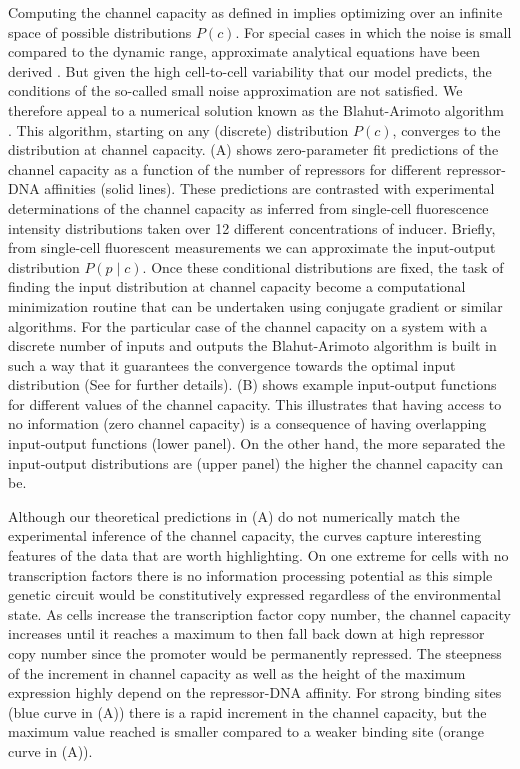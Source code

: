 Computing the channel capacity as defined in  implies
optimizing over an infinite space of possible distributions $P(c)$. For special
cases in which the noise is small compared to the dynamic range, approximate
analytical equations have been derived \cite{Tkacik2008a}. But given the high
cell-to-cell variability that our model predicts, the conditions of the
so-called small noise approximation are not satisfied. We therefore appeal to a
numerical solution known as the Blahut-Arimoto algorithm \cite{Blahut1972}.
This algorithm, starting on any (discrete) distribution $P(c)$, converges to
the distribution at channel capacity. (A) shows
zero-parameter fit predictions of the channel capacity as a function of the
number of repressors for different repressor-DNA affinities (solid lines).
These predictions are contrasted with experimental determinations of the
channel capacity as inferred from single-cell fluorescence intensity
distributions taken over 12 different concentrations of inducer. Briefly, from
single-cell fluorescent measurements we can approximate the input-output
distribution $P(p \mid c)$. Once these conditional distributions are fixed, the
task of finding the input distribution at channel capacity become a
computational minimization routine that can be undertaken using conjugate
gradient or similar algorithms. For the particular case of the channel capacity
on a system with a discrete number of inputs and outputs the Blahut-Arimoto
algorithm is built in such a way that it guarantees the convergence towards the
optimal input distribution (See  for further details).
(B) shows example input-output functions for different
values of the channel capacity. This illustrates that having access to no
information (zero channel capacity) is a consequence of having overlapping
input-output functions (lower panel). On the other hand, the more separated the
input-output distributions are (upper panel) the higher the channel capacity
can be.

Although our theoretical predictions in (A) do not
numerically match the experimental inference of the channel capacity, the
curves capture interesting features of the data that are worth highlighting. On
one extreme for cells with no transcription factors there is no information
processing potential as this simple genetic circuit would be constitutively
expressed regardless of the environmental state. As cells increase the
transcription factor copy number, the channel capacity increases until it
reaches a maximum to then fall back down at high repressor copy number since
the promoter would be permanently repressed. The steepness of the increment in
channel capacity as well as the height of the maximum expression highly depend
on the repressor-DNA affinity. For strong binding sites (blue curve in
(A)) there is a rapid increment in the channel capacity,
but the maximum value reached is smaller compared to a weaker binding site
(orange curve in (A)). 

